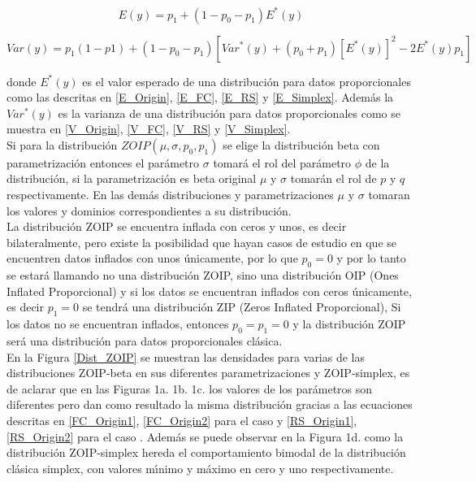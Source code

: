 \begin{equation}
	E(y) = p_1+(1-p_0-p_1)E^*(y)
\end{equation}

\begin{equation}
	Var(y) = p_1(1-p1)+(1-p_0-p_1)\left[Var^*(y)+(p_0+p_1)[E^*(y)]^2-2E^*(y)p_1\right]
\end{equation}

donde $E^*(y)$ es el valor esperado de una distribuci\'{o}n para datos proporcionales como las des\-cri\-tas en \eqref{E_Origin}, \eqref{E_FC}, \eqref{E_RS} y \eqref{E_Simplex}. Adem\'{a}s la $Var^*(y)$ es la varianza de una distribuci\'{o}n para datos proporcionales como se muestra en \eqref{V_Origin}, \eqref{V_FC}, \eqref{V_RS} y \eqref{V_Simplex}.\\

Si para la distribuci\'{o}n $ZOIP(\mu, \sigma, p_0, p_1)$ se elige la distribuci\'{o}n beta con parametrizaci\'{o}n \cite{Ferrari2} entonces el par\'{a}metro $\sigma$ tomar\'{a} el rol del par\'{a}metro $\phi$ de la distribuci\'{o}n, si la parametrizaci\'{o}n es beta original $\mu$ y $\sigma$ tomar\'{a}n el rol de $p$ y $q$ respectivamente. En las dem\'{a}s distribuciones y parametrizaciones $\mu$ y $\sigma$ tomaran los valores y dominios correspondientes a su distribuci\'{o}n.\\

La distribuci\'{o}n ZOIP se encuentra inflada con ceros y unos, es decir bilateralmente, pero existe la posibilidad que hayan casos de estudio en que se encuentren datos inflados con unos \'{u}nicamente, por lo que $p_0=0$ y por lo tanto se estar\'{a} llamando no una distribuci\'{o}n ZOIP, sino una distribuci\'{o}n OIP (Ones Inflated Proporcional) y si los datos se encuentran inflados con ceros \'{u}nicamente, es decir $p_1=0$ se tendr\'{a} una distribuci\'{o}n ZIP (Zeros Inflated Proporcional), Si los datos no se encuentran inflados, entonces $p_0=p_1=0$ y la distribuci\'{o}n ZOIP ser\'{a} una distribuci\'{o}n para datos proporcionales cl\'{a}sica.\\

En la Figura \ref{Dist_ZOIP} se muestran las densidades para varias de las distribuciones ZOIP-beta en sus diferentes parametrizaciones y ZOIP-simplex, es de aclarar que en las Figuras 1a. 1b. 1c. los valores de los par\'{a}metros son diferentes pero dan como resultado la misma distribuci\'{o}n gracias a las ecuaciones descritas en \eqref{FC_Origin1}, \eqref{FC_Origin2} para el caso \cite{Ferrari2} y \eqref{RS_Origin1}, \eqref{RS_Origin2} para el caso \cite{Stasinopoulos2}. Adem\'{a}s se puede observar en la Figura 1d. como la distribuci\'{o}n ZOIP-simplex hereda el comportamiento bimodal de la distribuci\'{o}n cl\'{a}sica simplex, con valores m\'{\i}nimo y m\'{a}ximo en cero y uno respectivamente. 

